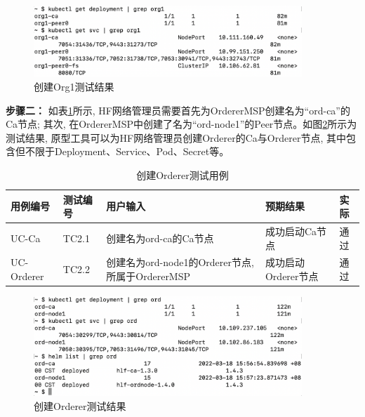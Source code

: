 \begin{figure}[h] %
    \centering %
    \includegraphics[width=0.9\textwidth]{FIGs/chapter5/peer.png} %
    \caption{创建Org1测试结果} %
    \label{testcase1result} %
\end{figure}%

\textbf{步骤二：} 如表\ref{orderer_test}所示, HF网络管理员需要首先为OrdererMSP创建名为“ord-ca”的Ca节点; 其次, 在OrdererMSP中创建了名为“ord-node1”的Peer节点。如图\ref{testcase2result}所示为测试结果, 原型工具可以为HF网络管理员创建Orderer的Ca与Orderer节点, 其中包含但不限于Deployment、Service、Pod、Secret等。

{\footnotesize
\begin{longtable}[h]{m{45pt} m{45pt} m{180pt} m{50pt} m{20pt}}
    \caption[创建Orderer测试用例]{创建Orderer测试用例} \label{orderer_test}\\
        \hline  
        用例编号&测试编号&用户输入&预期结果&实际\\
        \hline
        UC-Ca & TC2.1 & 创建名为ord-ca的Ca节点 & 成功启动Ca节点 & 通过 \\
        \hline
        UC-Orderer & TC2.2 & 创建名为ord-node1的Orderer节点, 所属于OrdererMSP & 成功启动Orderer节点 & 通过 \\
        \hline
    \end{longtable} 
}

\begin{figure}[h] %
    \centering %
    \includegraphics[width=0.9\textwidth]{FIGs/chapter5/orderer.png} %
    \caption{创建Orderer测试结果} %
    \label{testcase2result} %
\end{figure}%

